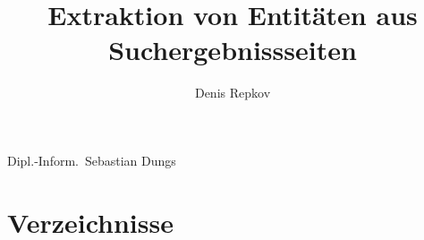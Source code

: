 \documentclass[
11pt,
titlepage,
a4paper,
abstracton,
twoside,
openright,
chapterprefix,
noappendixprefix,
headsepline,
footsepline,
cleardoubleplain,
bibtotoc,
liststotoc,
pointlessnumbers
]{scrreprt}
\begin{document}
\title{Extraktion von Entitäten aus Suchergebnissseiten}
\author{Denis Repkov}
{Dipl.-Inform.~Sebastian Dungs}

\maketitle

\setcounter{page}{2}
\begin{abstract}
\thispagestyle{plain}

\end{abstract}

\pagestyle{scrheadings}
\setcounter{tocdepth}{2}
\tableofcontents

\cleardoublepage
{}
\pagestyle{scrheadings}
\sloppy


%
%

%
%

%

\cleardoublepage
\part*{Verzeichnisse}



%
\end{document}
